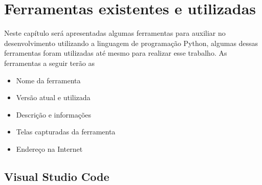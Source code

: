 

\chapter{Ferramentas existentes e utilizadas}
Neste capítulo será apresentadas algumas ferramentas para auxiliar no desenvolvimento utilizando a linguagem de programação Python, algumas dessas ferramentas foram utilizadas até mesmo para realizar esse trabalho. As ferramentas a seguir terão as \begin{itemize}
	\item Nome da ferramenta
	\item Versão atual e utilizada
	\item Descrição e informações
	\item Telas capturadas da ferramenta
	\item Endereço na Internet
\end{itemize}

    \section{Visual Studio Code}

